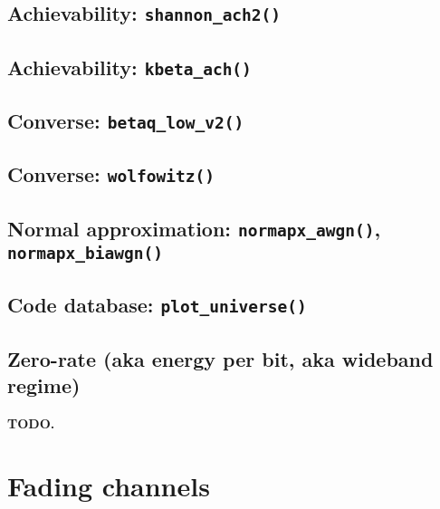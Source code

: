 \documentclass[a4paper,11p]{memoir}
\begin{document}
\cprotect\section{Achievability: \verb|shannon_ach2()|}

\cprotect\section{Achievability: \verb|kbeta_ach()|}

\cprotect\section{Converse: \verb|betaq_low_v2()|}

\cprotect\section{Converse: \verb|wolfowitz()|}

\cprotect\section{Normal approximation: \verb|normapx_awgn()|, \verb|normapx_biawgn()|}

\cprotect\section{Code database: \verb|plot_universe()|}

\cprotect\section{Zero-rate (aka energy per bit, aka wideband regime)}
\textbf{TODO.}

\chapter{Fading channels}


\end{document}

